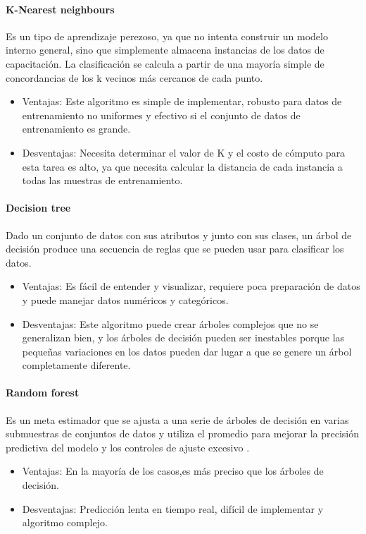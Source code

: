 \paragraph{K-Nearest neighbours} Es un tipo de aprendizaje perezoso, ya que no intenta construir un modelo interno general, sino que simplemente almacena instancias de los datos de capacitación. La clasificación se calcula a partir de una mayoría simple de concordancias de los k vecinos más cercanos de cada punto\citep{MarcoTeorico12}.
\begin{itemize}
	\item Ventajas: Este algoritmo es simple de implementar, robusto para datos de entrenamiento no uniformes y efectivo si el conjunto de datos de entrenamiento es grande.
	\item Desventajas: Necesita determinar el valor de K y el costo de cómputo para esta tarea es alto, ya que necesita calcular la distancia de cada instancia a todas las muestras de entrenamiento.
\end{itemize}
\paragraph{Decision tree}
Dado un conjunto de datos con sus atributos y junto con sus clases, un árbol de decisión produce una secuencia de reglas que se pueden usar para clasificar los datos\citep{MarcoTeorico12}.
\begin{itemize}
	\item Ventajas: Es fácil de entender y visualizar, requiere poca preparación de datos y puede manejar datos numéricos y categóricos.
	\item Desventajas: Este algoritmo puede crear árboles complejos que no se generalizan bien, y los árboles de decisión pueden ser inestables porque las pequeñas variaciones en los datos pueden dar lugar a que se genere un árbol completamente diferente.
\end{itemize}
\paragraph{Random forest}Es un meta estimador que se ajusta a una serie de árboles de decisión en varias submuestras de conjuntos de datos y utiliza el promedio para mejorar la precisión predictiva del modelo y los controles de ajuste excesivo \citep{MarcoTeorico12}.
\begin{itemize}
	\item Ventajas: En la mayoría de los casos,es más preciso que los árboles de decisión.
	\item Desventajas: Predicción lenta en tiempo real, difícil de implementar y algoritmo complejo.
\end{itemize}
